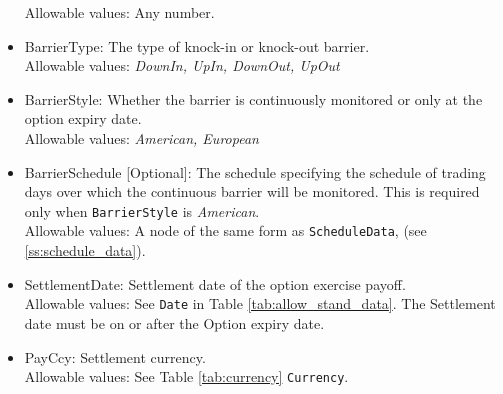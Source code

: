 \begin{itemize}
  Allowable values: Any number.
  \item BarrierType: The type of knock-in or knock-out barrier. \\
  Allowable values: \emph{DownIn, UpIn, DownOut, UpOut}
  \item BarrierStyle: Whether the barrier is continuously monitored or only at the option expiry date. \\
  Allowable values: \emph{American, European}
  \item BarrierSchedule [Optional]: The schedule specifying the schedule of trading days over which the continuous
  barrier will be monitored. This is required only when \lstinline!BarrierStyle! is \emph{American}. \\
  Allowable values: A node of the same form as \lstinline!ScheduleData!, (see \ref{ss:schedule_data}).
  \item SettlementDate: Settlement date of the option exercise payoff. \\
  Allowable values: See \lstinline!Date! in Table \ref{tab:allow_stand_data}. The Settlement date must be on or after the Option expiry date.
  \item PayCcy: Settlement currency. \\
  Allowable values: See Table \ref{tab:currency} \lstinline!Currency!.
\end{itemize}